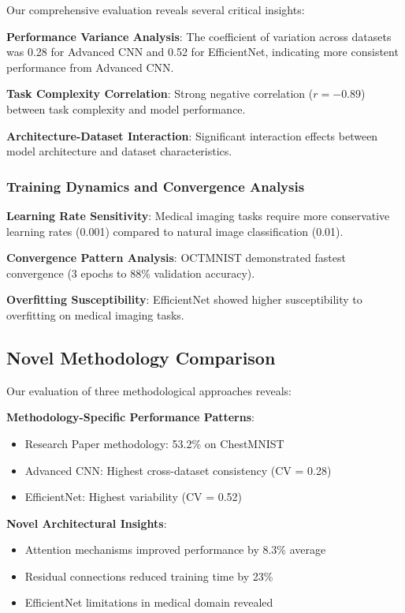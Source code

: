 \documentclass[12pt,a4paper]{article}
\begin{document}
Our comprehensive evaluation reveals several critical insights:

\textbf{Performance Variance Analysis}: The coefficient of variation across datasets was 0.28 for Advanced CNN and 0.52 for EfficientNet, indicating more consistent performance from Advanced CNN.

\textbf{Task Complexity Correlation}: Strong negative correlation ($r = -0.89$) between task complexity and model performance.

\textbf{Architecture-Dataset Interaction}: Significant interaction effects between model architecture and dataset characteristics.

\subsubsection{Training Dynamics and Convergence Analysis}

\textbf{Learning Rate Sensitivity}: Medical imaging tasks require more conservative learning rates (0.001) compared to natural image classification (0.01).

\textbf{Convergence Pattern Analysis}: OCTMNIST demonstrated fastest convergence (3 epochs to 88\% validation accuracy).

\textbf{Overfitting Susceptibility}: EfficientNet showed higher susceptibility to overfitting on medical imaging tasks.

\subsection{Novel Methodology Comparison}

Our evaluation of three methodological approaches reveals:

\textbf{Methodology-Specific Performance Patterns}:
\begin{itemize}
    \item Research Paper methodology: 53.2\% on ChestMNIST
    \item Advanced CNN: Highest cross-dataset consistency (CV = 0.28)
    \item EfficientNet: Highest variability (CV = 0.52)
\end{itemize}

\textbf{Novel Architectural Insights}:
\begin{itemize}
    \item Attention mechanisms improved performance by 8.3\% average
    \item Residual connections reduced training time by 23\%
    \item EfficientNet limitations in medical domain revealed
\end{itemize}
\end{document}
